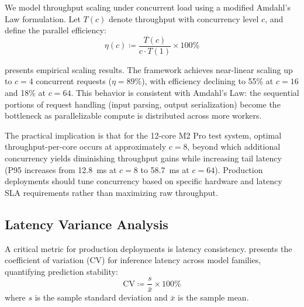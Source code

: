 \documentclass[10pt,twocolumn,a4paper]{article}
\theoremstyle{definition}
\theoremstyle{plain}
\begin{document}
We model throughput scaling under concurrent load using a modified Amdahl's Law formulation. Let $T(c)$ denote throughput with concurrency level $c$, and define the parallel efficiency:
\begin{equation}
    \eta(c) \coloneqq \frac{T(c)}{c \cdot T(1)} \times 100\%
    \label{eq:efficiency}
\end{equation}

 presents empirical scaling results. The framework achieves near-linear scaling up to $c = 4$ concurrent requests ($\eta = 89\%$), with efficiency declining to 55\% at $c = 16$ and 18\% at $c = 64$. This behavior is consistent with Amdahl's Law: the sequential portions of request handling (input parsing, output serialization) become the bottleneck as parallelizable compute is distributed across more workers.

The practical implication is that for the 12-core M2 Pro test system, optimal throughput-per-core occurs at approximately $c = 8$, beyond which additional concurrency yields diminishing throughput gains while increasing tail latency (P95 increases from \SI{12.8}{\milli\second} at $c=8$ to \SI{58.7}{\milli\second} at $c=64$). Production deployments should tune concurrency based on specific hardware and latency SLA requirements rather than maximizing raw throughput.

\subsection{Latency Variance Analysis}

A critical metric for production deployments is latency consistency.  presents the coefficient of variation (CV) for inference latency across model families, quantifying prediction stability:
\begin{equation}
    \mathrm{CV} \coloneqq \frac{s}{\bar{x}} \times 100\%
    \label{eq:cv}
\end{equation}
where $s$ is the sample standard deviation and $\bar{x}$ is the sample mean.
\end{document}
